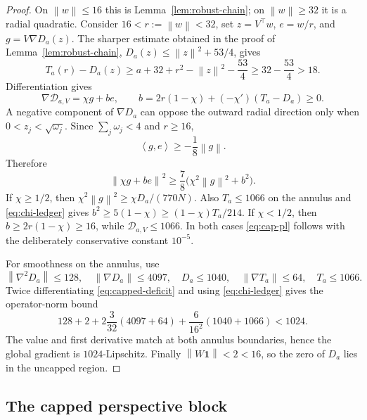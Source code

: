 \documentclass[11pt,a4paper]{article}
\newcommand{\norm}[1]{\left\lVert #1\right\rVert}
\newcommand{\ip}[2]{\left\langle #1,#2\right\rangle}
\newcommand{\one}{\mathbf 1}
\theoremstyle{definition}
\theoremstyle{remark}
\numberwithin{equation}{section}
\begin{document}
\begin{proof}
On $\norm w\le16$ this is Lemma~\ref{lem:robust-chain}; on $\norm w\ge32$ it is a radial quadratic.  Consider $16<r:=\norm w<32$, set $z=V^\top w$, $e=w/r$, and $g=V\nabla D_a(z)$.  The sharper estimate obtained in the proof of Lemma~\ref{lem:robust-chain},
$D_a(z)\le\norm z^2+53/4$, gives
\[
 T_a(r)-D_a(z)
 \ge a+32+r^2-\norm z^2-\frac{53}{4}
 \ge32-\frac{53}{4}>18.
\]
Differentiation gives
\begin{equation}
 \nabla\mathscr D_{a,V}=\chi g+be,
 \qquad
 b=2r(1-\chi)+(-\chi')(T_a-D_a)\ge0.
 \label{eq:cap-gradient-decomp}
\end{equation}
A negative component of $\nabla D_a$ can oppose the outward radial direction only when
$0<z_j<\sqrt{\omega_j}$.  Since $\sum_j\omega_j<4$ and $r\ge16$,
\[
 \ip{g}{e}\ge-\frac18\norm g.
\]
Therefore
\begin{equation}
 \norm{\chi g+be}^2
 \ge\frac78\bigl(\chi^2\norm g^2+b^2\bigr).
 \label{eq:cap-no-cancel}
\end{equation}
If $\chi\ge1/2$, then
$\chi^2\norm g^2\ge\chi D_a/(770N)$.  Also
$T_a\le1066$ on the annulus and \eqref{eq:chi-ledger} gives
$b^2\ge5(1-\chi)\ge(1-\chi)T_a/214$.  If $\chi<1/2$, then
$b\ge2r(1-\chi)\ge16$, while
$\mathscr D_{a,V}\le1066$.  In both cases \eqref{eq:cap-pl} follows with the deliberately conservative constant $10^{-5}$.

For smoothness on the annulus, use
\[
 \norm{\nabla^2D_a}\le128,
 \quad \norm{\nabla D_a}\le4097,
 \quad D_a\le1040,
 \quad \norm{\nabla T_a}\le64,
 \quad T_a\le1066.
\]
Twice differentiating \eqref{eq:capped-deficit} and using \eqref{eq:chi-ledger} gives the operator-norm bound
\[
 128+2+2\frac{3}{32}(4097+64)+\frac6{16^2}(1040+1066)<1024.
\]
The value and first derivative match at both annulus boundaries, hence the global gradient is $1024$-Lipschitz.  Finally $\norm{W\one}<2<16$, so the zero of $D_a$ lies in the uncapped region.
\end{proof}

\subsection{The capped perspective block}
\label{sec:perspective}
\end{document}
